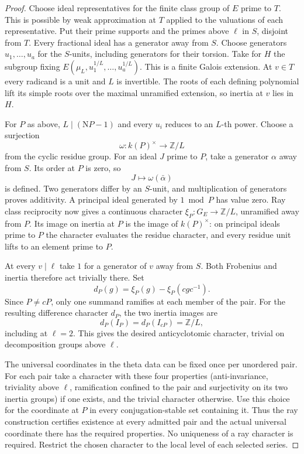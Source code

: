 \begin{proof}
Choose ideal representatives for the finite class group of \(E\)
prime to \(T\). This is possible by weak approximation at \(T\)
applied to the valuations of each representative. Put their prime
supports and the primes above \(\ell\) in \(S\), disjoint from \(T\).
Every fractional ideal has a generator away from \(S\). Choose
generators \(u_1,\ldots,u_a\) for the \(S\)-units, including
generators for their torsion. Take for \(H\) the subgroup fixing
\(E(\mu_L,u_1^{1/L},\ldots,u_a^{1/L})\). This is a finite
Galois extension. At \(v\in T\) every radicand is a unit
and \(L\) is invertible. The roots of each defining polynomial
lift its simple roots over the maximal unramified extension, so
inertia at \(v\) lies in \(H\).

For \(P\) as above, \(L\mid (\mathrm NP-1)\) and every \(u_i\)
reduces to an \(L\)-th power. Choose a surjection
\[
 \omega:k(P)^\times\to\mathbb Z/L
\]
from the cyclic residue
group. For an ideal \(J\) prime to \(P\), take a generator
\(\alpha\) away from \(S\). Its order at \(P\) is zero, so
\[
 J\mapsto\omega(\bar\alpha)
\]
is defined. Two generators
differ by an \(S\)-unit, and multiplication of generators proves
additivity. A principal ideal generated by \(1\bmod P\) has
value zero. Ray class reciprocity now gives a continuous
character \(\xi_P:G_E\to\mathbb Z/L\), unramified away from
\(P\). Its image on inertia at \(P\) is the image of \(k(P)^\times\):
on principal ideals prime to \(P\) the character evaluates the
residue character, and every residue unit lifts to an element
prime to \(P\).

At every \(v\mid\ell\) take \(1\) for a
generator of \(v\) away from \(S\). Both Frobenius and inertia
therefore act trivially there. Set
\[
       d_P(g)=\xi_P(g)-\xi_P(cgc^{-1}).
\]
Since \(P\ne cP\), only one summand ramifies at each member of
the pair. For the resulting difference character \(d_P\), the two inertia images are
\[
 d_P(I_P)=d_P(I_{cP})=\mathbb Z/L,
\]
including at \(\ell=2\).
This gives the desired anticyclotomic character, trivial on
decomposition groups above \(\ell\). \cite{milne-cft}

The universal coordinates in the theta data can be fixed once
per unordered pair. For each pair take a character with these
four properties (anti-invariance, triviality above \(\ell\),
ramification confined to the pair and surjectivity on its two
inertia groups) if one exists, and the trivial character otherwise.
Use this choice for the coordinate at \(P\) in every
conjugation-stable set containing it. Thus the ray construction
certifies existence at every admitted pair and the actual universal
coordinate there has the required properties. No uniqueness of a
ray character is required.
Restrict the chosen character to the local level of each selected series.


\end{proof}
